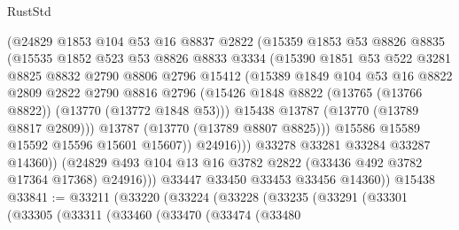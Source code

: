 \begin{lexlean}{RustStd}
\begin{coremodule}
                    (@24829
                      @1853
                      @104
                      @53
                      @16
                      @8837
                      @2822
                      (@15359
                        @1853
                        @53
                        @8826
                        @8835
                        (@15535
                          @1852
                          @523
                          @53
                          @8826
                          @8833
                          @3334
                          (@15390
                            @1851
                            @53
                            @522
                            @3281
                            @8825
                            @8832
                            @2790
                            @8806
                            @2796
                            @15412
                            (@15389
                              @1849
                              @104
                              @53
                              @16
                              @8822
                              @2809
                              @2822
                              @2790
                              @8816
                              @2796
                              (@15426
                                @1848
                                @8822
                                (@13765 (@13766 @8822))
                                (@13770 (@13772 @1848 @53)))
                              @15438
                              @13787
                              (@13770 (@13789 @8817 @2809)))
                            @13787
                            (@13770 (@13789 @8807 @8825)))
                          @15586
                          @15589
                          @15592
                          @15596
                          @15601
                          @15607))
                      @24916)))
                @33278
                @33281
                @33284
                @33287
                @14360))
            (@24829 @493 @104 @13 @16 @3782 @2822 (@33436 @492 @3782 @17364 @17368) @24916)))
        @33447
        @33450
        @33453
        @33456
        @14360))
    @15438
@33841 := @33211
    (@33220
      (@33224
        (@33228
          (@33235
            (@33291
              (@33301
                (@33305
                  (@33311
                    (@33460
                      (@33470
                        (@33474
                          (@33480

\end{coremodule}
\end{lexlean}
